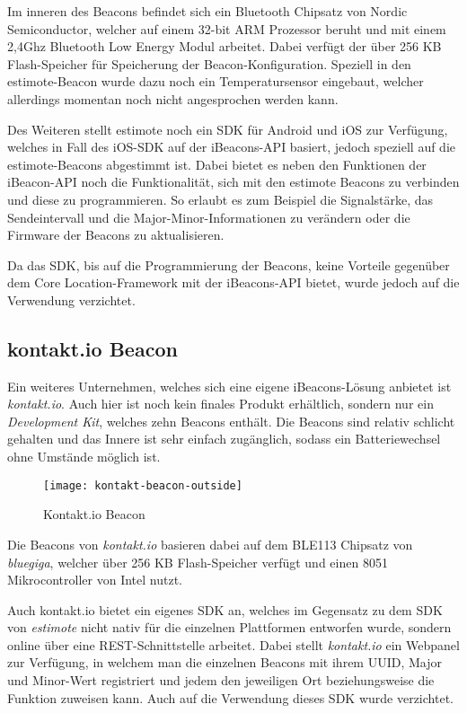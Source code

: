 Im inneren des Beacons befindet sich ein Bluetooth Chipsatz von Nordic Semiconductor, welcher auf einem 32-bit ARM Prozessor beruht und mit einem 2,4Ghz Bluetooth Low Energy Modul arbeitet. Dabei verfügt der über 256 KB Flash-Speicher für Speicherung der Beacon-Konfiguration.
Speziell in den estimote-Beacon wurde dazu noch ein Temperatursensor eingebaut, welcher allerdings momentan noch nicht angesprochen werden kann.

Des Weiteren stellt estimote noch ein SDK für Android und iOS zur Verfügung, welches in Fall des iOS-SDK auf der iBeacons-API basiert, jedoch speziell auf die estimote-Beacons abgestimmt ist. 
Dabei bietet es neben den Funktionen der iBeacon-API noch die Funktionalität, sich mit den estimote Beacons zu verbinden und diese zu programmieren. So erlaubt es zum Beispiel die Signalstärke, das Sendeintervall und die Major-Minor-Informationen zu verändern oder die Firmware der Beacons zu aktualisieren.

Da das SDK, bis auf die Programmierung der Beacons, keine Vorteile gegenüber dem Core Location-Framework mit der iBeacons-API bietet, wurde jedoch auf die Verwendung verzichtet.

\subsection{kontakt.io Beacon}
\label{sec:dataandmeasurement:mobilebeacon:kontaktio}
Ein weiteres Unternehmen, welches sich eine eigene iBeacons-Lösung anbietet ist \emph{kontakt.io}. Auch hier ist noch kein finales Produkt erhältlich, sondern nur ein \emph{Development Kit}, welches zehn Beacons enthält. 
Die Beacons sind relativ schlicht gehalten und das Innere ist sehr einfach zugänglich, sodass ein Batteriewechsel ohne Umstände möglich ist.


\begin{figure}[htb!]
		\centering
	\texttt{[image: kontakt-beacon-outside]}
	\caption{Kontakt.io Beacon}
	\label{kontakt-beacon-outside}
\end{figure}

Die Beacons von \emph{kontakt.io} basieren dabei auf dem BLE113 Chipsatz von \emph{bluegiga}, welcher über 256 KB Flash-Speicher verfügt und einen 8051 Mikrocontroller von Intel nutzt.


Auch kontakt.io bietet ein eigenes SDK an, welches im Gegensatz zu dem SDK von \emph{estimote} nicht nativ für die einzelnen Plattformen entworfen wurde, sondern online über eine REST-Schnittstelle arbeitet.
Dabei stellt \emph{kontakt.io} ein Webpanel zur Verfügung, in welchem man die einzelnen Beacons mit ihrem UUID, Major und Minor-Wert registriert und jedem den jeweiligen Ort beziehungsweise die Funktion zuweisen kann. 
Auch auf die Verwendung dieses SDK wurde verzichtet.



